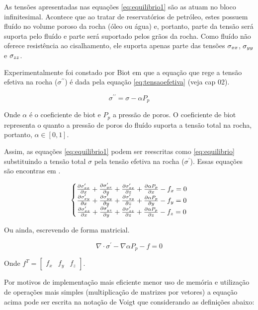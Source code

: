As tensões apresentadas nas equações \ref{eq:equilibrio1} são as atuam no bloco infinitesimal. Acontece que ao tratar de reservatórios de petróleo, estes possuem fluído no volume poroso da rocha (óleo ou água) e, portanto, parte da tensão será suporta pelo fluído e parte será suportado pelos grãos da rocha. Como fluído não oferece resistência ao cisalhamento, ele suporta apenas parte das tensões $\sigma_{xx}$, $\sigma_{yy}$ e $\sigma_{zz}$.

Experimentalmente foi constado por Biot em que a equação que rege a tensão efetiva na rocha ($\sigma^{\prime\prime}$) é dada pela equação \ref{eq:tensaoefetiva} (veja \cite{ResGeomec} cap 02).

\begin{equation}
\label{eq:tensaoefetiva}
    \sigma^{\prime\prime} = \sigma - \alpha P_p
\end{equation}

Onde $\alpha$ é o coeficiente de biot e $P_p$ a pressão de poros. O coeficiente de biot representa o quanto a pressão de poros do fluído suporta a tensão total na rocha, portanto, $\alpha \in [0,1]$.

Assim, as equações \ref{eq:equilibrio1} podem ser reescritas como \ref{eq:equilibrio} substituindo a tensão total $\sigma$ pela tensão efetiva na rocha ($\sigma^\prime$). Essas equações são encontras em \cite{CompGeomec}.



\begin{equation}
\label{eq:equilibrio}
\left\{\begin{matrix}
\dx[\sxx]  + \dy[\syx] + \dz[\szx] + \dx[\alpha P_p] - f_x   = 0
\\
\dx[\sxy]  + \dy[\syy] + \dz[\szy] + \dy[\alpha P_p]  - f_y   = 0
\\
\dx[\sxz]  + \dy[\syz] + \dz[\szz] + \dz[\alpha P_p] - f_z   = 0
\end{matrix}\right.
\end{equation}

Ou ainda, escrevendo de forma matricial.

\begin{equation}
\label{eq:equilibrio_matriz}
\nabla \cdot \sigma^\prime - \nabla \alpha P_p - f = 0
\end{equation}

Onde $f^T=\begin{bmatrix}f_x & f_y & f_z\end{bmatrix}$.


Por motivos de implementação mais eficiente menor uso de memória e utilização de operações mais simples (multiplicação de matrizes por vetores) a equação acima pode ser escrita na notação de Voigt que considerando as definições abaixo:

